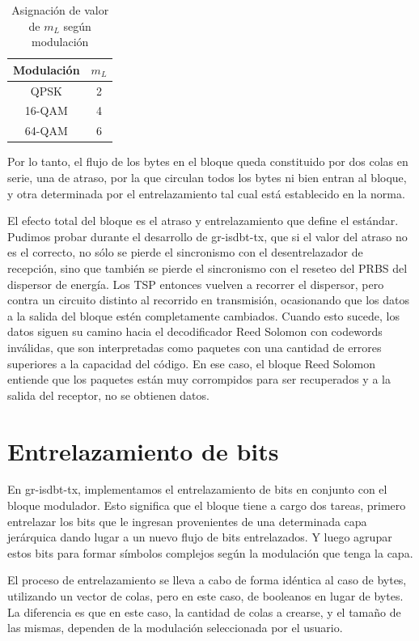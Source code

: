 \begin{table}[h!]
	\centering
	\begin{tabular}{|c|c|}
		\hline
		\textbf{Modulación} & \textbf{$m_L$}\\
		\hline
		QPSK		& 2\\
		\hline
		16-QAM 		& 4\\
		\hline
		64-QAM		& 6\\
		\hline
	\end{tabular}
	\caption{\label{corr_ml} Asignación de valor de $m_L$ según modulación}
\end{table}

Por lo tanto, el flujo de los bytes en el bloque queda constituido por dos colas en serie, una de atraso, por la que circulan todos los bytes ni bien entran al bloque, y otra determinada por el entrelazamiento tal cual está establecido en la norma. 

El efecto total del bloque es el atraso y entrelazamiento que define el estándar. Pudimos probar durante el desarrollo de gr-isdbt-tx, que si el valor del atraso no es el correcto, no sólo se pierde el sincronismo con el desentrelazador de recepción, sino que también se pierde el sincronismo con el reseteo del PRBS del dispersor de energía. Los TSP entonces vuelven a recorrer el dispersor, pero contra un circuito distinto al recorrido en transmisión, ocasionando que los datos a la salida del bloque estén completamente cambiados. Cuando esto sucede, los datos siguen su camino hacia el decodificador Reed Solomon con codewords inválidas, que son interpretadas como paquetes con una cantidad de errores superiores a la capacidad del código. En ese caso, el bloque Reed Solomon entiende que los paquetes están muy corrompidos para ser recuperados y a la salida del receptor, no se obtienen datos.
  
\section{Entrelazamiento de bits}\label{sect:entrelazamiento_bits}

En gr-isdbt-tx, implementamos el entrelazamiento de bits en conjunto con el bloque modulador. Esto significa que el bloque tiene a cargo dos tareas, primero entrelazar los bits que le ingresan provenientes de una determinada capa jerárquica dando lugar a un nuevo flujo de bits entrelazados. Y luego agrupar estos bits para formar símbolos complejos según la modulación que tenga la capa.

El proceso de entrelazamiento se lleva a cabo de forma idéntica al caso de bytes, utilizando un vector de colas, pero en este caso, de booleanos en lugar de bytes. La diferencia es que en este caso, la cantidad de colas a crearse, y el tamaño de las mismas, dependen de la modulación seleccionada por el usuario.

